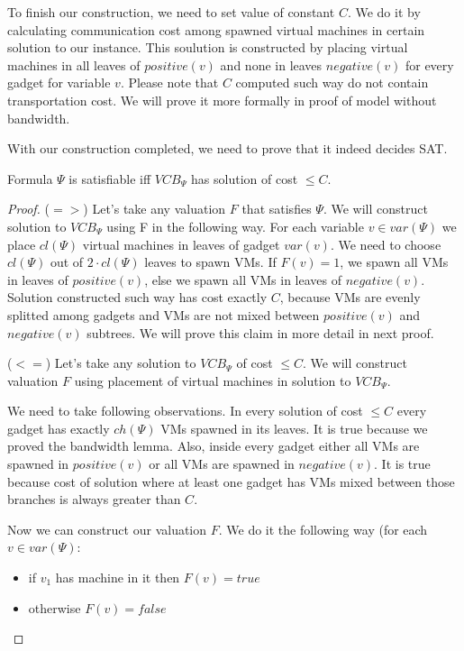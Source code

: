 To finish our construction, we need to set value of constant $C$. We
do it by calculating communication cost among spawned virtual machines in
certain solution to our instance. This soulution is constructed by placing
virtual machines in all leaves of $positive(v)$ and none in leaves
$negative(v)$ for every gadget for variable $v$. Please note that $C$
computed such way do not contain transportation cost. We will prove it
more formally in proof of model without bandwidth.

With our construction completed, we need to prove that it indeed
decides SAT.

\begin{theorem}Formula $\Psi$ is satisfiable iff $VCB_{\Psi}$ has
solution of cost $\leq C$.
\end{theorem}

\begin{proof}
($=>$) Let's take any valuation $F$ that satisfies $\Psi$. We will construct
solution to $VCB_{\Psi}$ using F in the following way. For each
variable $v \in var(\Psi)$ we place $cl(\Psi)$ virtual machines in
leaves of gadget $var(v)$. We need to choose $cl(\Psi)$ out of
$2 \cdot cl(\Psi)$ leaves to spawn VMs. If $F(v) = 1$, we spawn all VMs in leaves
of $positive(v)$, else we spawn all VMs in leaves of
$negative(v)$. Solution constructed such way has cost exactly
$C$, because VMs are evenly splitted among gadgets and VMs are not
mixed between $positive(v)$ and $negative(v)$ subtrees. We will prove
this claim in more detail in next proof. 

($<=$) Let's take any solution to $VCB_{\Psi}$ of cost $\leq C$. We
will construct valuation $F$ using placement of virtual machines in
solution to $VCB_{\Psi}$.

We need to take following observations. In every solution of cost
$\leq C$ every gadget has exactly $ch(\Psi)$ VMs spawned in its
leaves. It is true because we proved the bandwidth lemma. Also, inside
every gadget either all VMs are spawned in $positive(v)$ or all VMs
are spawned in $negative(v)$. It is true because cost of solution
where at least one gadget has VMs mixed between those branches is
always greater than $C$.

Now we can construct our valuation $F$. We do it the following way
(for each $v \in var(\Psi)$:

\begin{itemize}
\item if $v_1$ has machine in it then $F(v) = true$
\item otherwise $F(v) = false$
\end{itemize}


\end{proof}
